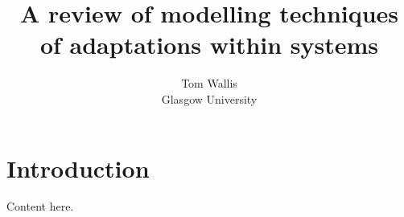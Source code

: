 \documentclass[12pt]{article}
\title{A review of modelling techniques of adaptations within systems}
\date{}
\author{Tom Wallis\\Glasgow University}
\begin{document}
\maketitle

\section{Introduction}
Content here.



\end{document}
